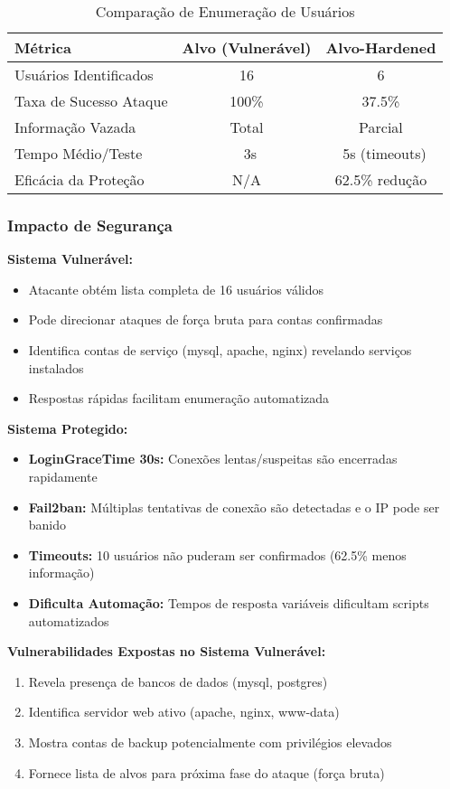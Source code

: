 \documentclass[12pt]{article}
\begin{document}
\begin{table}[h]
\centering
\begin{tabular}{|l|c|c|}
\hline
\textbf{Métrica} & \textbf{Alvo (Vulnerável)} & \textbf{Alvo-Hardened} \\ \hline
Usuários Identificados & 16 & 6 \\ \hline
Taxa de Sucesso Ataque & 100\% & 37.5\% \\ \hline
Informação Vazada & Total & Parcial \\ \hline
Tempo Médio/Teste & ~3s & ~5s (timeouts) \\ \hline
Eficácia da Proteção & N/A & 62.5\% redução \\ \hline
\end{tabular}
\caption{Comparação de Enumeração de Usuários}
\end{table}

\subsubsection{Impacto de Segurança}

\textbf{Sistema Vulnerável:}
\begin{itemize}
    \item Atacante obtém lista completa de 16 usuários válidos
    \item Pode direcionar ataques de força bruta para contas confirmadas
    \item Identifica contas de serviço (mysql, apache, nginx) revelando serviços instalados
    \item Respostas rápidas facilitam enumeração automatizada
\end{itemize}

\textbf{Sistema Protegido:}
\begin{itemize}
    \item \textbf{LoginGraceTime 30s:} Conexões lentas/suspeitas são encerradas rapidamente
    \item \textbf{Fail2ban:} Múltiplas tentativas de conexão são detectadas e o IP pode ser banido
    \item \textbf{Timeouts:} 10 usuários não puderam ser confirmados (62.5\% menos informação)
    \item \textbf{Dificulta Automação:} Tempos de resposta variáveis dificultam scripts automatizados
\end{itemize}

\textbf{Vulnerabilidades Expostas no Sistema Vulnerável:}
\begin{enumerate}
    \item Revela presença de bancos de dados (mysql, postgres)
    \item Identifica servidor web ativo (apache, nginx, www-data)
    \item Mostra contas de backup potencialmente com privilégios elevados
    \item Fornece lista de alvos para próxima fase do ataque (força bruta)
\end{enumerate}
\end{document}
